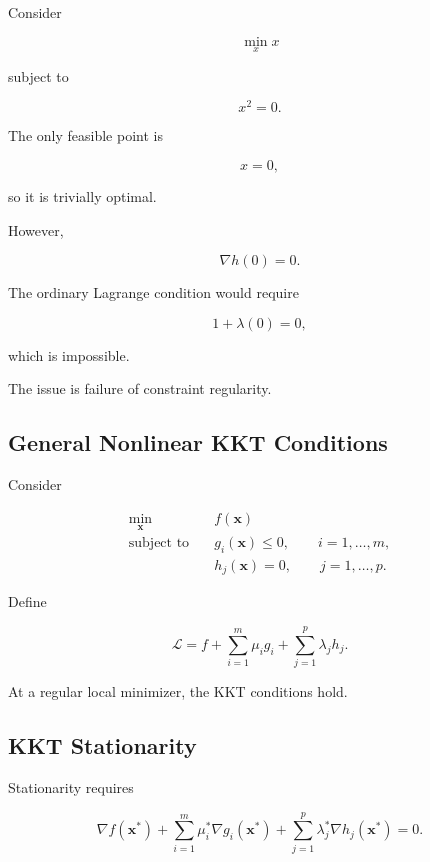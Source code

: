 Consider

\[
\boxed{
\min_x x
}
\]

subject to

\[
\boxed{
x^2=0.
}
\]

The only feasible point is

\[
x=0,
\]

so it is trivially optimal.

However,

\[
\nabla h(0)=0.
\]

The ordinary Lagrange condition would require

\[
1+\lambda(0)=0,
\]

which is impossible.

The issue is failure of constraint regularity.

\subsection{General Nonlinear KKT Conditions}
\label{subsec:nlp-kkt}

Consider

\[
\boxed{
\begin{aligned}
\min_{\mathbf{x}}
\quad&
f(\mathbf{x})
\\
\text{subject to}
\quad&
g_i(\mathbf{x})\leq0,
\qquad i=1,\ldots,m,
\\
&
h_j(\mathbf{x})=0,
\qquad j=1,\ldots,p.
\end{aligned}
}
\]

Define

\[
\boxed{
\mathcal{L}
=
f
+
\sum_{i=1}^{m}
\mu_i g_i
+
\sum_{j=1}^{p}
\lambda_j h_j.
}
\]

At a regular local minimizer, the KKT conditions hold.

\subsection{KKT Stationarity}
\label{subsec:nlp-kkt-stationarity}

Stationarity requires

\[
\boxed{
\nabla f(\mathbf{x}^*)
+
\sum_{i=1}^{m}
\mu_i^*
\nabla g_i(\mathbf{x}^*)
+
\sum_{j=1}^{p}
\lambda_j^*
\nabla h_j(\mathbf{x}^*)
=
0.
}
\]

